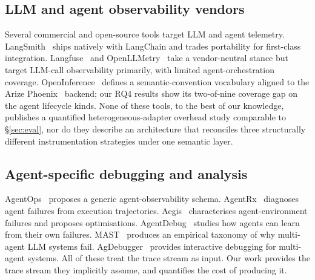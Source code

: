 \documentclass[sigconf,review,anonymous,9pt]{acmart}
\begin{document}
\subsection{LLM and agent observability vendors}
Several commercial and open-source tools target LLM and agent
telemetry. LangSmith~\cite{langsmith} ships natively with LangChain
and trades portability for first-class integration.
Langfuse~\cite{langfuse} and OpenLLMetry~\cite{openllmetry} take a
vendor-neutral stance but target LLM-call observability primarily,
with limited agent-orchestration coverage. OpenInference~\cite{openinference}
defines a semantic-convention vocabulary aligned to the Arize
Phoenix~\cite{arize_phoenix} backend; our RQ4 results show its
two-of-nine coverage gap on the agent lifecycle kinds. None of
these tools, to the best of our knowledge, publishes a quantified
heterogeneous-adapter overhead study comparable to \S\ref{sec:eval},
nor do they describe an architecture that reconciles three
structurally different instrumentation strategies under one semantic
layer.

\subsection{Agent-specific debugging and analysis}
AgentOps~\cite{agentops} proposes a generic agent-observability
schema. AgentRx~\cite{agentrx} diagnoses agent failures from
execution trajectories. Aegis~\cite{aegis} characterises
agent-environment failures and proposes optimisations.
AgentDebug~\cite{agentdebug} studies how agents can learn from
their own failures. MAST~\cite{mast} produces an empirical taxonomy
of why multi-agent LLM systems fail. AgDebugger~\cite{agdebugger}
provides interactive debugging for multi-agent systems. All of
these treat the trace stream as input. Our work provides the trace
stream they implicitly assume, and quantifies the cost of producing
it.
\end{document}
